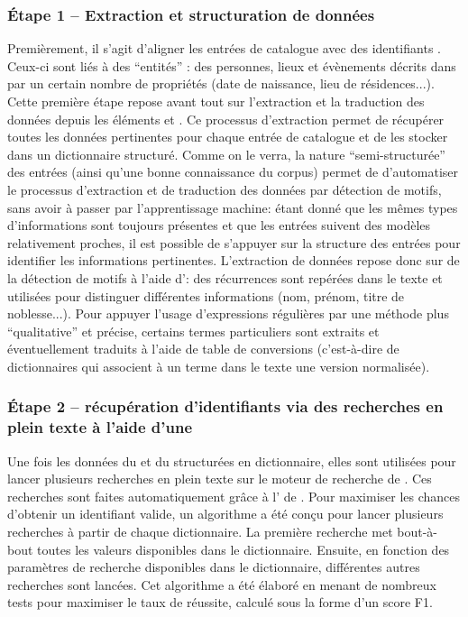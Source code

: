 \subsubsection{Étape 1 -- Extraction et structuration de données}
Premièrement, il s'agit d'aligner les entrées de catalogue avec des identifiants \wkd{}. Ceux-ci sont liés à des \enquote{entités} \wkd{}: des personnes, lieux et évènements décrits dans \wkd{} par un certain nombre de propriétés (date de naissance, lieu de résidences...). Cette première étape repose avant tout sur l'extraction et la traduction des données depuis les éléments \tname{} et \ttrait{}. Ce processus d'extraction permet de récupérer toutes les données pertinentes pour chaque entrée de catalogue et de les stocker dans un \gls{dictionnaire} structuré. Comme on le verra, la nature \enquote{semi-structurée} des entrées (ainsi qu'une bonne connaissance du corpus) permet de d'automatiser le processus d'extraction et de traduction des données par détection de motifs, sans avoir à passer par l'apprentissage machine: étant donné que les mêmes types d'informations sont toujours présentes et que les entrées suivent des modèles relativement proches, il est possible de s'appuyer sur la structure des entrées pour identifier  les informations pertinentes. L'extraction de données repose donc sur de la détection de motifs à l'aide d'\rgxpl{}: des récurrences sont repérées dans le texte et utilisées pour distinguer différentes informations (nom, prénom, titre de noblesse...). Pour appuyer l'usage d'expressions régulières par une méthode plus \enquote{qualitative} et précise, certains termes particuliers sont extraits et éventuellement traduits à l'aide de \glspl{table de conversion} (c'est-à-dire de \glspl{dictionnaire} qui associent à un terme dans le texte une version normalisée). 

\subsubsection{Étape 2 -- récupération d'identifiants \wkd{} via des recherches en plein texte à l'aide d'une \api{}}
Une fois les données du \tname{} et du \ttrait{} structurées en dictionnaire, elles sont utilisées pour lancer plusieurs recherches en plein texte sur le moteur de recherche de \wkd{}. Ces recherches sont faites automatiquement grâce à l'\api{} de \wkd{}. Pour maximiser les chances d'obtenir un identifiant valide, un algorithme a été conçu pour lancer plusieurs recherches à partir de chaque dictionnaire. La première recherche met bout-à-bout toutes les valeurs disponibles dans le dictionnaire. Ensuite, en fonction des paramètres de recherche disponibles dans le dictionnaire, différentes autres recherches sont lancées. Cet algorithme a été élaboré en menant de nombreux tests pour maximiser le taux de réussite, calculé sous la forme d'un \gls{score F1}.

